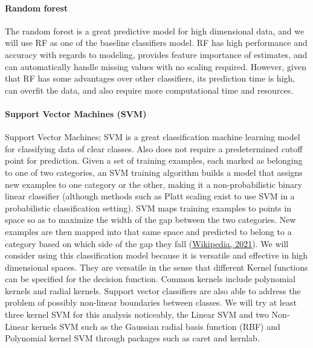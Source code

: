 \documentclass[
  10pt,
]{article}
\begin{document}
\paragraph{Random forest}

The random forest is a great predictive model for high dimensional data, and we will use RF as one of the baseline classifiers model. RF has high performance and accuracy with regards to modeling, provides feature importance of estimates, and can automatically handle missing values with no scaling required. However, given that RF has some advantages over other classifiers, its prediction time is high, can overfit the data, and also require more computational time and resources.

\hypertarget{support-vector-machines-svm}{%
\paragraph{\texorpdfstring{Support Vector Machines (SVM) }{Support Vector Machines (SVM)  }}\label{support-vector-machines-svm}}

Support Vector Machines; SVM is a great classification machine learning model for classifying data of clear classes. Also does not require a predetermined cutoff point for prediction. Given a set of training examples, each marked as belonging to one of two categories, an SVM training algorithm builds a model that assigns new examples to one category or the other, making it a non-probabilistic binary linear classifier (although methods such as Platt scaling exist to use SVM in a probabilistic classification setting). SVM maps training examples to points in space so as to maximize the width of the gap between the two categories. New examples are then mapped into that same space and predicted to belong to a category based on which side of the gap they fall (\protect\hyperlink{ref-wikipedia}{Wikipedia, 2021}).
We will consider using this classification model because it is versatile and effective in high dimensional spaces. They are versatile in the sense that different Kernel functions can be specified for the decision function. Common kernels include polynomial kernels and radial kernels. Support vector classifiers are also able to address the problem of possibly non-linear boundaries between classes. We will try at least three kernel SVM for this analysis noticeably, the Linear SVM and two Non-Linear kernels SVM such as the Gaussian radial basis function (RBF) and Polynomial kernel SVM through packages such as caret and kernlab.
\end{document}
